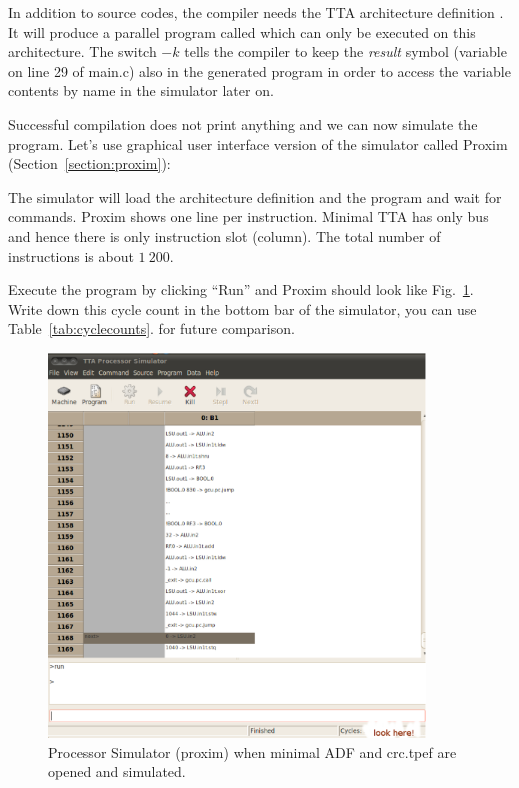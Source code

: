 \documentclass[twoside]{tceusermanual}
\begin{document}
In addition to source codes, the compiler needs the TTA architecture
definition . It will produce a parallel program called
 which can only be executed on this architecture. The
switch $-k$ tells the compiler to keep the \textit{result} symbol
(variable on line 29 of main.c) also in the generated program in order
to access the variable contents by name in the simulator later on.

Successful compilation does not print anything and we can now simulate
the program. Let's use graphical user interface version of the
simulator called Proxim (Section~\ref{section:proxim}):


The simulator will load the architecture definition and the program
and wait for commands. Proxim shows one line per instruction. Minimal
TTA has only bus and hence there is only instruction slot
(column). The total number of instructions is about $1~200$.

Execute the program by clicking ``Run'' and Proxim should look like
Fig.~\ref{fig:proxim}.  Write down this cycle count in the bottom bar
of the simulator, you can use Table~\ref{tab:cyclecounts}. for future comparison.
\begin{figure}
  \begin{center}
    \includegraphics[width=10cm]{eps/proxim_scrshot.eps}
    \caption{Processor Simulator (proxim) when minimal ADF 
             and crc.tpef are opened and simulated.}
    \label{fig:proxim}
  \end{center}
\end{figure}
\end{document}
